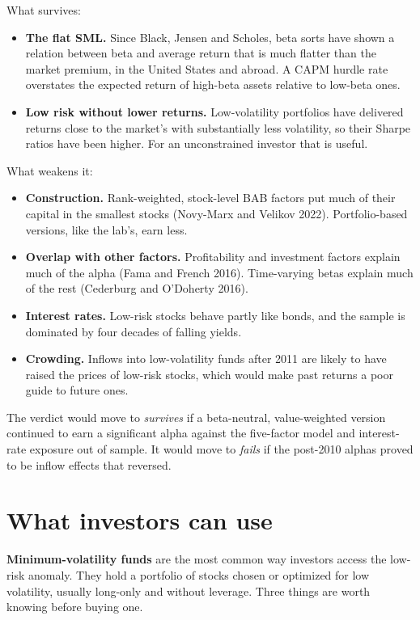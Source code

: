 What survives:

\begin{itemize}
  \item \textbf{The flat SML.} Since Black, Jensen and Scholes, beta sorts have shown a relation between beta and average return that is much flatter than the market premium, in the United States and abroad. A CAPM hurdle rate overstates the expected return of high-beta assets relative to low-beta ones.
  \item \textbf{Low risk without lower returns.} Low-volatility portfolios have delivered returns close to the market's with substantially less volatility, so their Sharpe ratios have been higher. For an unconstrained investor that is useful.
\end{itemize}

What weakens it:

\begin{itemize}
  \item \textbf{Construction.} Rank-weighted, stock-level BAB factors put much of their capital in the smallest stocks (Novy-Marx and Velikov 2022). Portfolio-based versions, like the lab's, earn less.
  \item \textbf{Overlap with other factors.} Profitability and investment factors explain much of the alpha (Fama and French 2016). Time-varying betas explain much of the rest (Cederburg and O'Doherty 2016).
  \item \textbf{Interest rates.} Low-risk stocks behave partly like bonds, and the sample is dominated by four decades of falling yields.
  \item \textbf{Crowding.} Inflows into low-volatility funds after 2011 are likely to have raised the prices of low-risk stocks, which would make past returns a poor guide to future ones.
\end{itemize}

The verdict would move to \emph{survives} if a beta-neutral, value-weighted version continued to earn a significant alpha against the five-factor model and interest-rate exposure out of sample. It would move to \emph{fails} if the post-2010 alphas proved to be inflow effects that reversed.

\section{What investors can use}
\label{sec:12-investors}

\textbf{Minimum-volatility funds} are the most common way investors access the low-risk anomaly. They hold a portfolio of stocks chosen or optimized for low volatility, usually long-only and without leverage. Three things are worth knowing before buying one.

